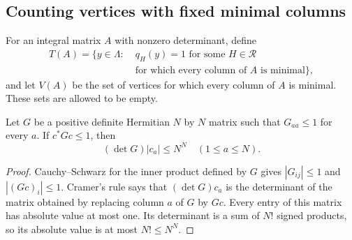 \subsection{Counting vertices with fixed minimal columns}

For an integral matrix $A$ with nonzero determinant, define
\[
 \begin{split}
 T(A)=\{y\in\Lambda:\;&q_H(y)=1
       \text{ for some }H\in\mathcal R\\
       &\text{for which every column of }A\text{ is minimal}\},
 \end{split}
\]
and let $V(A)$ be the set of vertices for which every column
of $A$ is minimal.  These sets are allowed to be empty.

\begin{lemma}\label{ac-cramer}
Let $G$ be a positive definite Hermitian $N$ by $N$ matrix
such that $G_{aa}\le1$ for every $a$.  If $c^*Gc\le1$, then
\[
                          (\det G)|c_a|\le N^N
                          \quad(1\le a\le N).
                          \tag{AC16}
\]
\end{lemma}
\begin{proof}
Cauchy--Schwarz for the inner product defined by $G$ gives
$|G_{ij}|\le1$ and $|(Gc)_i|\le1$.
Cramer's rule says that $(\det G)c_a$ is the determinant
of the matrix obtained by replacing column $a$ of $G$
by $Gc$.  Every entry of this matrix has absolute value
at most one.  Its determinant is a sum of $N!$ signed
products, so its absolute value is at most
$N!\le N^N$.
\end{proof}

